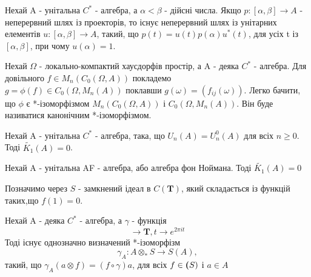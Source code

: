 \begin{lemma}
    Нехай A - унітальна $C^*$ - алгебра, а $\alpha < \beta$ - дійсні числа.
    Якщо $p: [\alpha, \beta] \to A$ - неперервний шлях із проекторів, то існує неперервний шлях із унітарних елементів
    $u: [\alpha, \beta] \to A$, такий, що $p(t) = u(t)p(\alpha)u^*(t)$, для усіх t із $[\alpha, \beta]$, при чому $u(\alpha)=1$.
\end{lemma}

\begin{remark}
    Нехай $\Omega$ - локально-компактий хаусдорфів простір, а A - деяка $C^*$ - алгебра.
    Для довільного $f \in M_n(C_0(\Omega, A))$ покладемо \\ $g = \phi(f) \in C_0(\Omega, M_n(A))$ поклавши
    $g(\omega) = (f_{ij}(\omega))$.
    Легко бачити, що $\phi$ є *-ізоморфізмом $M_n(C_0(\Omega, A))$ і $C_0(\Omega, M_n(A))$.
    Він буде називатися канонічним *-ізоморфізмом.
\end{remark}

\begin{lemma}
    Нехай A - унітальна $C^*$ - алгебра, така, що $U_n(A) = U_n^0(A)$ для всіх $n \geq 0$.
    Тоді $\widetilde{K_1}(A) = 0$.

\end{lemma}

\begin{theorem}
    Нехай A - унітальна AF - алгебра, або алгебра фон Ноймана.
    Тоді $\widetilde{K_1}(A) = 0$
\end{theorem}

Позначимо через $S$ - замкнений ідеал в $C(\textbf{T})$, який складається із функцій таких,що $f(1) = 0$.
\begin{theorem}
    Нехай A - деяка $C^*$ - алгебра, а $\gamma$ - функція
    \begin{equation*}
    [0,1]
        \to \textbf{T}, t \to e^{2\pi i t}
    \end{equation*}
    Тоді існує однозначно визначений *-ізоморфізм
    \begin{equation*}
        \gamma_A: A \otimes_* S \to S(A),
    \end{equation*}
    такий, що $\gamma_A(a \otimes f) = (f \circ \gamma)a$, для всіх $f \in \textbf(S)$ і $a \in A$
\end{theorem}

